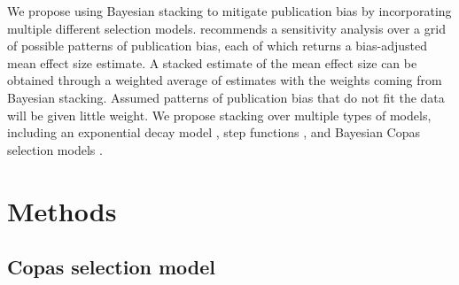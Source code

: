 \documentclass[12pt]{article}   	%
\numberwithin{equation}{section}
\begin{document}
We propose using Bayesian stacking to mitigate publication bias by incorporating multiple different selection models. \citet{copas2001sensitivity} recommends a sensitivity analysis over a grid of possible patterns of publication bias, each of which returns a bias-adjusted mean effect size estimate. A stacked estimate of the mean effect size can be obtained through a weighted average of estimates with the weights coming from Bayesian stacking. Assumed patterns of publication bias that do not fit the data will be given little weight. We propose stacking over multiple types of models, including an exponential decay model \citep{givens1997}, step functions \citep{hedges1992selection, vevea1995pubbias}, and Bayesian Copas selection models \citet{mavridis2013copas, bai2020}. 

\section{Methods} \label{sec:methods}

\subsection{Copas selection model} \label{sec:copas}
\end{document}
